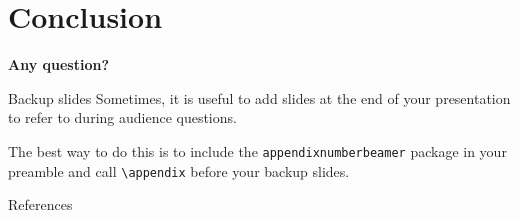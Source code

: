 \documentclass[aspectratio=169%
]{beamer}
\begin{document}

\section{Conclusion}

{%
  \begin{frame}[standout] %
    \centering\huge\bfseries
    Any question?
  \end{frame}
}

\appendix

\begin{frame}[fragile]{Backup slides} %
  Sometimes, it is useful to add slides at the end of your presentation to refer to during audience questions.

  The best way to do this is to include the \verb|appendixnumberbeamer| package in your preamble and call \verb|\appendix| before your backup slides.
\end{frame}

\begin{frame}[allowframebreaks]{References}
  \nocite{*}
  \printbibliography[heading=none]
\end{frame}
\end{document}
